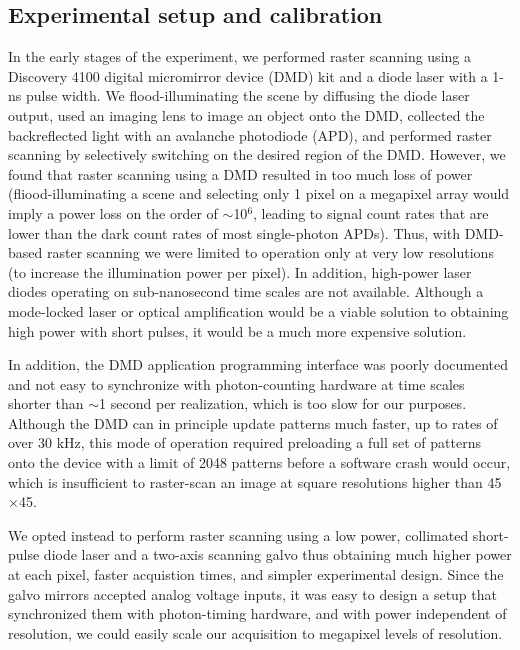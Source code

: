 \subsection{Experimental setup and calibration}

In the early stages of the experiment, we performed raster scanning using a Discovery 4100 digital micromirror device (DMD) kit and a diode laser with a 1-ns pulse width. We flood-illuminating the scene by diffusing the diode laser output, used an imaging lens to image an object onto the DMD, collected the backreflected light with an avalanche photodiode (APD), and performed raster scanning by selectively switching on the desired region of the DMD. However, we found that raster scanning using a DMD resulted in too much loss of power (fliood-illuminating a scene and selecting only 1 pixel on a megapixel array would imply a power loss on the order of $\sim$10$^6$, leading to signal count rates that are lower than the dark count rates of most single-photon APDs). Thus, with DMD-based raster scanning we were limited to operation only at very low resolutions (to increase the illumination power per pixel). In addition, high-power laser diodes operating on sub-nanosecond time scales are not available. Although a mode-locked laser or optical amplification would be a viable solution to obtaining high power with short pulses, it would be a much more expensive solution.

In addition, the DMD application programming interface was poorly documented and not easy to synchronize with photon-counting hardware at time scales shorter than $\sim$1 second per realization, which is too slow for our purposes. Although the DMD can in principle update patterns much faster, up to rates of over 30 kHz, this mode of operation required preloading a full set of patterns onto the device with a limit of 2048 patterns before a software crash would occur, which is insufficient to raster-scan an image at square resolutions higher than 45$\times$45.

We opted instead to perform raster scanning using a low power, collimated short-pulse diode laser and a two-axis scanning galvo thus obtaining much higher power at each pixel, faster acquistion times, and simpler experimental design. Since the galvo mirrors accepted analog voltage inputs, it was easy to design a setup that synchronized them with photon-timing hardware, and with power independent of resolution, we could easily scale our acquisition to megapixel levels of resolution.

